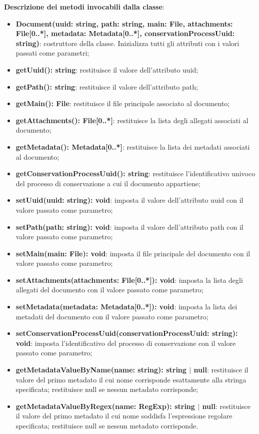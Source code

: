 \documentclass[a4paper,12pt]{article}
\begin{document}
{              \noindent \textbf{Descrizione dei metodi invocabili dalla classe}:
                \begin{itemize}
                    \item \textbf{Document(uuid: string, path: string, main: File, attachments: File[0..*], metadata: Metadata[0..*], conservationProcessUuid: string)}: costruttore della classe. Inizializza tutti gli attributi con i valori passati come parametri;
                    \item \textbf{getUuid(): string}: restituisce il valore dell'attributo uuid;
                    \item \textbf{getPath(): string}: restituisce il valore dell'attributo path;
                    \item \textbf{getMain(): File}: restituisce il file principale associato al documento;
                    \item \textbf{getAttachments(): File[0..*]}: restituisce la lista degli allegati associati al documento;
                    \item \textbf{getMetadata(): Metadata[0..*]}: restituisce la lista dei metadati associati al documento;
                    \item \textbf{getConservationProcessUuid(): string}: restituisce l'identificativo univoco del processo di conservazione a cui il documento appartiene;
                    \item \textbf{setUuid(uuid: string): void}: imposta il valore dell'attributo uuid con il valore passato come parametro;
                    \item \textbf{setPath(path: string): void}: imposta il valore dell'attributo path con il valore passato come parametro;
                    \item \textbf{setMain(main: File): void}: imposta il file principale del documento con il valore passato come parametro;
                    \item \textbf{setAttachments(attachments: File[0..*]): void}: imposta la lista degli allegati del documento con il valore passato come parametro;
                    \item \textbf{setMetadata(metadata: Metadata[0..*]): void}: imposta la lista dei metadati del documento con il valore passato come parametro;
                    \item \textbf{setConservationProcessUuid(conservationProcessUuid: string): void}: imposta l'identificativo del processo di conservazione con il valore passato come parametro;
                    \item \textbf{getMetadataValueByName(name: string): string $|$ null}: restituisce il valore del primo metadato il cui nome corrisponde esattamente alla stringa specificata; restituisce null se nessun metadato corrisponde;
                    \item \textbf{getMetadataValueByRegex(name: RegExp): string $|$ null}: restituisce il valore del primo metadato il cui nome soddisfa l'espressione regolare specificata; restituisce null se nessun metadato corrisponde.
                \end{itemize}

}
\end{document}

